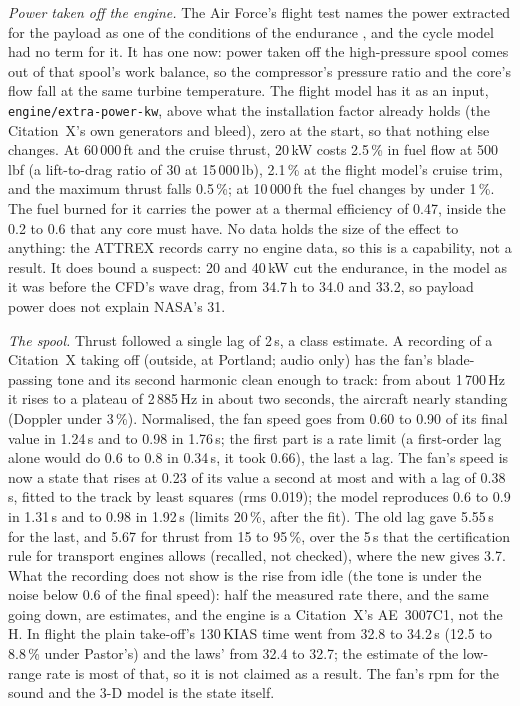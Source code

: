 \documentclass[10pt,a4paper,twocolumn]{article}
\begin{document}
\emph{Power taken off the engine.} The Air Force's flight test names the power extracted for the payload as one of the conditions of the endurance
\cite{sfte}, and the cycle model had no term for it. It has one now: power taken off the high-pressure spool comes out of that spool's work balance, so
the compressor's pressure ratio and the core's flow fall at the same turbine temperature. The flight model has it as an input,
\texttt{engine/extra-power-kw}, above what the installation factor already holds (the Citation~X's own generators and bleed), zero at the start, so that
nothing else changes. At 60\,000\,ft and the cruise thrust, 20\,kW costs 2.5\,\% in fuel flow at 500\,lbf (a lift-to-drag ratio of 30 at 15\,000\,lb), 2.1\,\% at the flight model's cruise trim, and the
maximum thrust falls 0.5\,\%; at 10\,000\,ft the fuel changes by under 1\,\%. The fuel burned for it carries the power at a thermal efficiency of 0.47, inside
the 0.2 to 0.6 that any core must have. No data holds the size of the effect to anything: the ATTREX records carry no engine data, so this is a capability, not
a result. It does bound a suspect: 20 and 40\,kW cut the endurance, in the model as it was before the CFD's wave drag, from 34.7\,h to 34.0 and 33.2, so payload power does not explain NASA's 31.

\emph{The spool.} Thrust followed a single lag of 2\,s, a class estimate. A recording of a Citation~X taking off (outside, at Portland; audio only) has the
fan's blade-passing tone and its second harmonic clean enough to track: from about 1\,700\,Hz it rises to a plateau of 2\,885\,Hz in about two seconds, the
aircraft nearly standing (Doppler under 3\,\%). Normalised, the fan speed goes from 0.60 to 0.90 of its final value in 1.24\,s and to 0.98 in 1.76\,s; the
first part is a rate limit (a first-order lag alone would do 0.6 to 0.8 in 0.34\,s, it took 0.66), the last a lag. The fan's speed is now a state that
rises at 0.23 of its value a second at most and with a lag of 0.38\,s, fitted to the track by least squares (rms 0.019); the model reproduces 0.6 to 0.9 in
1.31\,s and to 0.98 in 1.92\,s (limits 20\,\%, after the fit). The old lag gave 5.55\,s for the last, and 5.67 for thrust from 15 to 95\,\%, over the 5\,s
that the certification rule for transport engines allows (recalled, not checked), where the new gives 3.7. What the recording does not show is the rise from
idle (the tone is under the noise below 0.6 of the final speed): half the measured rate there, and the same going down, are estimates, and the engine is a
Citation~X's AE~3007C1, not the H. In flight the plain take-off's 130\,KIAS time went from 32.8 to 34.2\,s (12.5 to 8.8\,\% under Pastor's) and the laws' from
32.4 to 32.7; the estimate of the low-range rate is most of that, so it is not claimed as a result. The fan's rpm for the sound and the 3-D model is the state itself.
\end{document}
